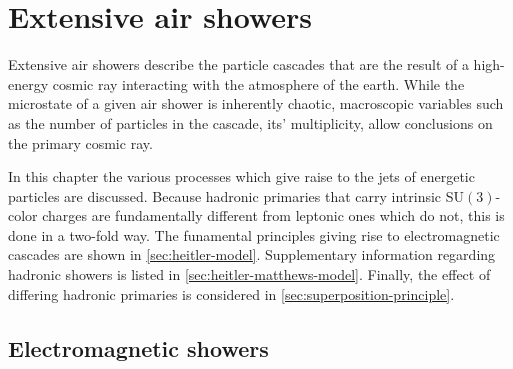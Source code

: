
\chapter{Extensive air showers}
\label{chapter:extensive-air-showers}

Extensive air showers describe the particle cascades that are the result of a high-energy cosmic ray interacting with the atmosphere of the earth. While the 
microstate of a given air shower is inherently chaotic, macroscopic variables such as the number of particles in the cascade, its' multiplicity, allow conclusions
on the primary cosmic ray.

In this chapter the various processes which give raise to the jets of energetic particles are discussed. Because hadronic primaries that carry intrinsic 
SU$(3)$-color charges are fundamentally different from leptonic ones which do not, this is done in a two-fold way. The funamental principles giving rise to 
electromagnetic cascades are shown in \autoref{sec:heitler-model}. Supplementary information regarding hadronic showers is listed in 
\autoref{sec:heitler-matthews-model}. Finally, the effect of differing hadronic primaries is considered in \autoref{sec:superposition-principle}.

\section{Electromagnetic showers}
\label{sec:heitler-model}

